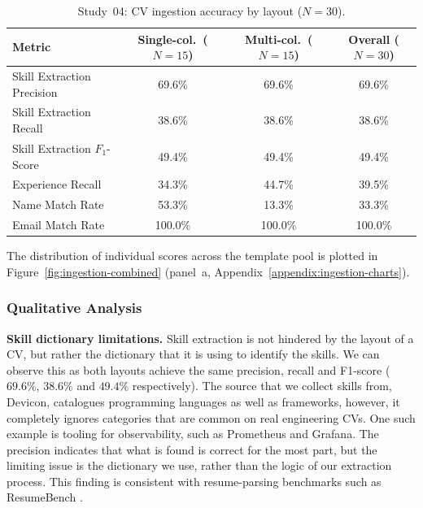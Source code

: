 \begin{table}[htbp]
    \centering
    \caption[Study~04: CV ingestion by layout]{Study~04: CV ingestion accuracy by layout ($N=30$).}
    \label{tab:cv_parser_results}
    \merittablesize
    \setlength{\tabcolsep}{6pt}
    \begin{tabular}{l c c c}
        \toprule
        \textbf{Metric} & \textbf{Single-col.\ ($N{=}15$)} & \textbf{Multi-col.\ ($N{=}15$)} & \textbf{Overall ($N{=}30$)} \\
        \midrule
        Skill Extraction Precision   & 69.6\%  & 69.6\%  & 69.6\%  \\
        Skill Extraction Recall      & 38.6\%  & 38.6\%  & 38.6\%  \\
        Skill Extraction $F_1$-Score & 49.4\%  & 49.4\%  & 49.4\%  \\
        Experience Recall            & 34.3\%  & 44.7\%  & 39.5\%  \\
        Name Match Rate              & 53.3\%  & 13.3\%  & 33.3\%  \\
        Email Match Rate             & 100.0\% & 100.0\% & 100.0\% \\
        \bottomrule
    \end{tabular}
\end{table}

The distribution of individual scores across the template pool is plotted in
Figure~\ref{fig:ingestion-combined} (panel~a, Appendix~\ref{appendix:ingestion-charts}).

\subsubsection{Qualitative Analysis}

\textbf{Skill dictionary limitations.} Skill extraction is not hindered by the layout of a CV, but rather the dictionary that it is 
using to identify the skills. We can observe this as both layouts achieve the same precision, recall and F1-score ($69.6\%$, $38.6\%$ and $49.4\%$ respectively).
The source that we collect skills from, Devicon, catalogues programming languages as well as frameworks, however, it completely
ignores categories that are common on real engineering CVs. One such example is tooling for observability, such as Prometheus and Grafana.
The precision indicates that what is found is correct for the most part, but the limiting issue is the dictionary we use, rather than the 
logic of our extraction process. This finding is consistent with resume-parsing benchmarks such as ResumeBench \cite{emnlp2025resumebench}.

